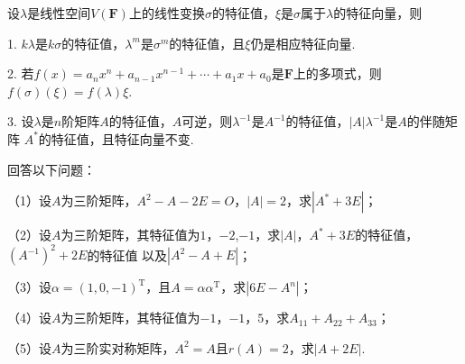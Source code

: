 设$\lambda$是线性空间$V(\mathbf{F})$上的线性变换$\sigma$的特征值，$\xi$是$\sigma$属于$\lambda$的特征向量，则

1. $k\lambda$是$k\sigma$的特征值，$\lambda^m$是$\sigma^m$的特征值，且$\xi$仍是相应特征向量.

2. 若$f(x)=a_nx^n+a_{n-1}x^{n-1}+\cdots+a_1x+a_0$是$\mathbf{F}$上的多项式，则$f(\sigma)(\xi)=f(\lambda)\xi$.

3. 设$\lambda$是$n$阶矩阵$A$的特征值，$A$可逆，则$\lambda^{-1}$是$A^{-1}$的特征值，$|A|\lambda^{-1}$是$A$的伴随矩阵
$A^*$的特征值，且特征向量不变.
\begin{example}
	回答以下问题：

	\textup{（1）}设$A$为三阶矩阵，$A^2-A-2E=O$，$|A|=2$，求$|A^*+3E|$\textup{；}
	
	\textup{（2）}设$A$为三阶矩阵，其特征值为$1$，$-2$,$-1$，求$|A|$，$A^*+3E$的特征值，$(A^{-1})^2+2E$的特征值
	以及$|A^2-A+E|$\textup{；}
	
	\textup{（3）}设$\alpha=(1,0,-1)^\mathrm{T}$，且$A=\alpha\alpha^\mathrm{T}$，求$|6E-A^n|$\textup{；}
	
	\textup{（4）}设$A$为三阶矩阵，其特征值为$-1$，$-1$，$5$，求$A_{11}+A_{22}+A_{33}$\textup{；}
	
	\textup{（5）}设$A$为三阶实对称矩阵，$A^2=A$且$r(A)=2$，求$|A+2E|$.
\end{example}

